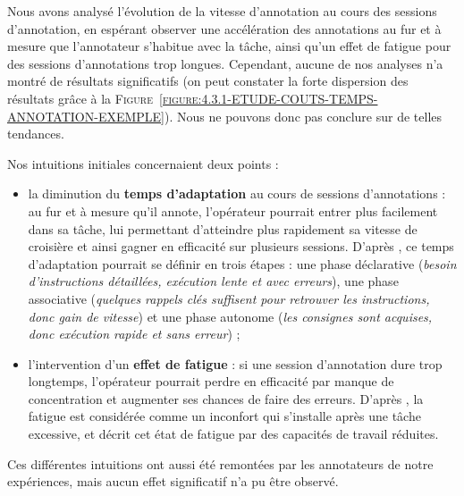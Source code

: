 			Nous avons analysé l'évolution de la vitesse d'annotation au cours des sessions d'annotation, en espérant observer une accélération des annotations au fur et à mesure que l'annotateur s'habitue avec la tâche, ainsi qu'un effet de fatigue pour des sessions d'annotations trop longues.
			Cependant, aucune de nos analyses n'a montré de résultats significatifs (on peut constater la forte dispersion des résultats grâce à la \textsc{Figure~\ref{figure:4.3.1-ETUDE-COUTS-TEMPS-ANNOTATION-EXEMPLE}}).
			Nous ne pouvons donc pas conclure sur de telles tendances.
			
			\begin{leftBarAuthorOpinion}
				Nos intuitions initiales concernaient deux points :
				\begin{itemize}
					\item la diminution du \textbf{temps d'adaptation} au cours de sessions d'annotations : au fur et à mesure qu'il annote, l'opérateur pourrait entrer plus facilement dans sa tâche, lui permettant d'atteindre plus rapidement sa vitesse de croisière et ainsi gagner en efficacité sur plusieurs sessions.
					D'après \cite{anderson:2013:architecture-cognition}, ce temps d'adaptation pourrait se définir en trois étapes : une phase déclarative (\textit{besoin d'instructions détaillées, exécution lente et avec erreurs}), une phase associative (\textit{quelques rappels clés suffisent pour retrouver les instructions, donc gain de vitesse}) et une phase autonome (\textit{les consignes sont acquises, donc exécution rapide et sans erreur}) ;
					\item l'intervention d'un \textbf{effet de fatigue} : si une session d'annotation dure trop longtemps, l'opérateur pourrait perdre en efficacité par manque de concentration et augmenter ses chances de faire des erreurs.
					D'après \cite{jones-etal:2015:demographic-occupational-predictors}, la fatigue est considérée comme un inconfort qui s'installe après une tâche excessive, et \cite{elkosantini-gien:2009:integration-human-behavioural} décrit cet état de fatigue par des capacités de travail réduites.
				\end{itemize}
				Ces différentes intuitions ont aussi été remontées par les annotateurs de notre expériences, mais aucun effet significatif n'a pu être observé.
			\end{leftBarAuthorOpinion}
		
